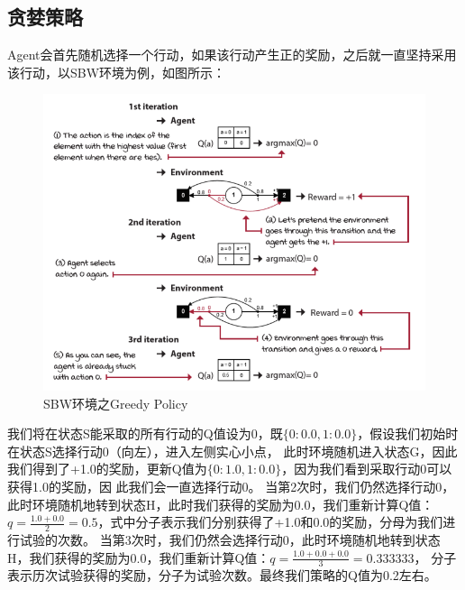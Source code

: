 \subsection{贪婪策略}
Agent会首先随机选择一个行动，如果该行动产生正的奖励，之后就一直坚持采用该行动，以SBW环境为例，如图所示：
\begin{figure}[H]
	\caption{SBW环境之Greedy Policy}
	\label{p000014}
	\centering
	\includegraphics[width=15cm]{images/p000014}
\end{figure}
我们将在状态S能采取的所有行动的Q值设为0，既$\{ 0: 0.0, 1: 0.0 \}$，假设我们初始时在状态S选择行动0（向左），进入左侧实心小点，
此时环境随机进入状态G，因此我们得到了+1.0的奖励，更新Q值为$\{ 0: 1.0, 1: 0.0 \}$，因为我们看到采取行动0可以获得1.0的奖励，因
此我们会一直选择行动0。
当第2次时，我们仍然选择行动0，此时环境随机地转到状态H，此时我们获得的奖励为0.0，我们重新计算Q值：
$q=\frac{1.0 + 0.0}{2}=0.5$，式中分子表示我们分别获得了+1.0和0.0的奖励，分母为我们进行试验的次数。
当第3次时，我们仍然会选择行动0，此时环境随机地转到状态H，我们获得的奖励为0.0，我们重新计算Q值：$q=\frac{1.0 + 0.0 + 0.0}{3}=0.333333$，
分子表示历次试验获得的奖励，分子为试验次数。最终我们策略的Q值为0.2左右。
